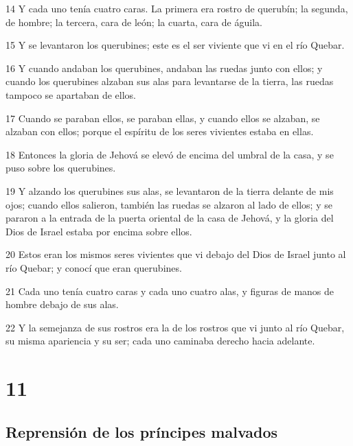\par 14 Y cada uno tenía cuatro caras. La primera era rostro de querubín; la segunda, de hombre; la tercera, cara de león; la cuarta, cara de águila. 
\par 15 Y se levantaron los querubines; este es el ser viviente que vi en el río Quebar.
\par 16 Y cuando andaban los querubines, andaban las ruedas junto con ellos; y cuando los querubines alzaban sus alas para levantarse de la tierra, las ruedas tampoco se apartaban de ellos.
\par 17 Cuando se paraban ellos, se paraban ellas, y cuando ellos se alzaban, se alzaban con ellos; porque el espíritu de los seres vivientes estaba en ellas.
\par 18 Entonces la gloria de Jehová se elevó de encima del umbral de la casa, y se puso sobre los querubines.
\par 19 Y alzando los querubines sus alas, se levantaron de la tierra delante de mis ojos; cuando ellos salieron, también las ruedas se alzaron al lado de ellos; y se pararon a la entrada de la puerta oriental de la casa de Jehová, y la gloria del Dios de Israel estaba por encima sobre ellos.
\par 20 Estos eran los mismos seres vivientes que vi debajo del Dios de Israel junto al río Quebar; y conocí que eran querubines.
\par 21 Cada uno tenía cuatro caras y cada uno cuatro alas, y figuras de manos de hombre debajo de sus alas.
\par 22 Y la semejanza de sus rostros era la de los rostros que vi junto al río Quebar, su misma apariencia y su ser; cada uno caminaba derecho hacia adelante.

\chapter{11}

\section*{Reprensión de los príncipes malvados}

